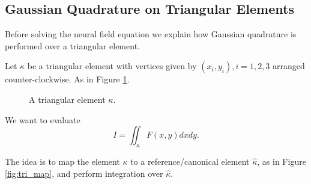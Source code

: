 \documentclass{uonmathreport}
\begin{document}
\subsection{Gaussian Quadrature on Triangular Elements}
\label{subsec:gquad_t_elems}
Before solving the neural field equation we explain how Gaussian quadrature is performed over a triangular element.

Let $\kappa$ be a triangular element with vertices given by $(x_i, y_i), i = 1,2,3$ arranged counter-clockwise. As in Figure \ref{fig:tri_elem}.

\begin{figure}[h]
\centering
{}
\caption{A triangular element $\kappa$.}
\label{fig:tri_elem}
\end{figure}
We want to evaluate 
\begin{equation}
I = \iint_{\kappa} F(x,y) dxdy.
\end{equation}

The idea is to map the element $\kappa$ to a reference/canonical element $\hat{\kappa}$, as in Figure \ref{fig:tri_map}, and perform integration over $\hat{\kappa}$.
\end{document}
